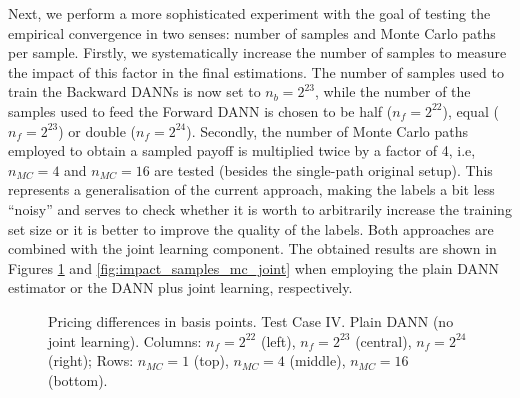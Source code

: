 		Next, we perform a more sophisticated experiment with the goal of testing the empirical convergence in two senses: number of samples and Monte Carlo paths per sample. Firstly, we systematically increase the number of samples to measure the impact of this factor in the final estimations. The number of samples used to train the Backward DANNs is now set to $n_b = 2^{23}$, while the number of the samples used to feed the Forward DANN is chosen to be half ($n_f = 2^{22}$), equal ($n_f = 2^{23}$) or double ($n_f = 2^{24}$). Secondly, the number of Monte Carlo paths employed to obtain a sampled payoff is multiplied twice by a factor of 4, i.e, $n_{MC} = 4$ and $n_{MC} = 16$ are tested (besides the single-path original setup). This represents a generalisation of the current approach, making the labels a bit less ``noisy'' and serves to check whether it is worth to arbitrarily increase the training set size or it is better to improve the quality of the labels. Both approaches are combined with the joint learning component. The obtained results are shown in Figures \ref{fig:impact_samples_mc} and \ref{fig:impact_samples_mc_joint} when employing the plain DANN estimator or the DANN plus joint learning, respectively.
		\begin{figure}[h!]
			\centering
			\caption{Pricing differences in basis points. Test Case IV. Plain DANN (no joint learning). Columns: $n_f = 2^{22}$ (left), $n_f = 2^{23}$ (central), $n_f = 2^{24}$ (right); Rows: $n_{MC} = 1$ (top), $n_{MC} = 4$ (middle), $n_{MC} = 16$ (bottom).}
			\label{fig:impact_samples_mc}
		\end{figure}

